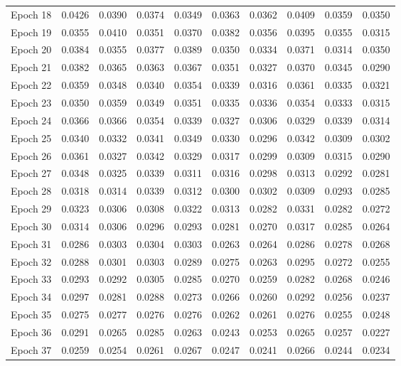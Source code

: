 \begin{table}[htbp]
\begin{tabular}{|l|l|l|l|l|l|l|l|l|l|}
Epoch 18 & 0.0426 & 0.0390 & 0.0374 & 0.0349 & 0.0363 & 0.0362 & 0.0409 & 0.0359 & 0.0350  \\
Epoch 19 & 0.0355 & 0.0410 & 0.0351 & 0.0370 & 0.0382 & 0.0356 & 0.0395 & 0.0355 & 0.0315  \\
Epoch 20 & 0.0384 & 0.0355 & 0.0377 & 0.0389 & 0.0350 & 0.0334 & 0.0371 & 0.0314 & 0.0350  \\
Epoch 21 & 0.0382 & 0.0365 & 0.0363 & 0.0367 & 0.0351 & 0.0327 & 0.0370 & 0.0345 & 0.0290  \\
Epoch 22 & 0.0359 & 0.0348 & 0.0340 & 0.0354 & 0.0339 & 0.0316 & 0.0361 & 0.0335 & 0.0321  \\
Epoch 23 & 0.0350 & 0.0359 & 0.0349 & 0.0351 & 0.0335 & 0.0336 & 0.0354 & 0.0333 & 0.0315  \\
Epoch 24 & 0.0366 & 0.0366 & 0.0354 & 0.0339 & 0.0327 & 0.0306 & 0.0329 & 0.0339 & 0.0314  \\
Epoch 25 & 0.0340 & 0.0332 & 0.0341 & 0.0349 & 0.0330 & 0.0296 & 0.0342 & 0.0309 & 0.0302  \\
Epoch 26 & 0.0361 & 0.0327 & 0.0342 & 0.0329 & 0.0317 & 0.0299 & 0.0309 & 0.0315 & 0.0290  \\
Epoch 27 & 0.0348 & 0.0325 & 0.0339 & 0.0311 & 0.0316 & 0.0298 & 0.0313 & 0.0292 & 0.0281  \\
Epoch 28 & 0.0318 & 0.0314 & 0.0339 & 0.0312 & 0.0300 & 0.0302 & 0.0309 & 0.0293 & 0.0285  \\
Epoch 29 & 0.0323 & 0.0306 & 0.0308 & 0.0322 & 0.0313 & 0.0282 & 0.0331 & 0.0282 & 0.0272  \\
Epoch 30 & 0.0314 & 0.0306 & 0.0296 & 0.0293 & 0.0281 & 0.0270 & 0.0317 & 0.0285 & 0.0264  \\
Epoch 31 & 0.0286 & 0.0303 & 0.0304 & 0.0303 & 0.0263 & 0.0264 & 0.0286 & 0.0278 & 0.0268  \\
Epoch 32 & 0.0288 & 0.0301 & 0.0303 & 0.0289 & 0.0275 & 0.0263 & 0.0295 & 0.0272 & 0.0255  \\
Epoch 33 & 0.0293 & 0.0292 & 0.0305 & 0.0285 & 0.0270 & 0.0259 & 0.0282 & 0.0268 & 0.0246  \\
Epoch 34 & 0.0297 & 0.0281 & 0.0288 & 0.0273 & 0.0266 & 0.0260 & 0.0292 & 0.0256 & 0.0237  \\
Epoch 35 & 0.0275 & 0.0277 & 0.0276 & 0.0276 & 0.0262 & 0.0261 & 0.0276 & 0.0255 & 0.0248  \\
Epoch 36 & 0.0291 & 0.0265 & 0.0285 & 0.0263 & 0.0243 & 0.0253 & 0.0265 & 0.0257 & 0.0227  \\
Epoch 37 & 0.0259 & 0.0254 & 0.0261 & 0.0267 & 0.0247 & 0.0241 & 0.0266 & 0.0244 & 0.0234  \\

\end{tabular}
\end{table}
